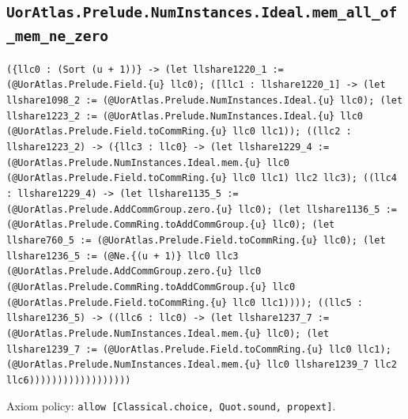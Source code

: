 \documentclass[11pt]{article}
\begin{document}
\subsection*{\texttt{UorAtlas.Prelude.NumInstances.Ideal.mem\_all\_of\_mem\_ne\_zero}}
\noindent\texttt{(\{llc0 : (Sort (u + 1))\} -> (let llshare1220\_1 := (@UorAtlas.Prelude.Field.\{u\} llc0); ([llc1 : llshare1220\_1] -> (let llshare1098\_2 := (@UorAtlas.Prelude.NumInstances.Ideal.\{u\} llc0); (let llshare1223\_2 := (@UorAtlas.Prelude.NumInstances.Ideal.\{u\} llc0 (@UorAtlas.Prelude.Field.toCommRing.\{u\} llc0 llc1)); ((llc2 : llshare1223\_2) -> (\{llc3 : llc0\} -> (let llshare1229\_4 := (@UorAtlas.Prelude.NumInstances.Ideal.mem.\{u\} llc0 (@UorAtlas.Prelude.Field.toCommRing.\{u\} llc0 llc1) llc2 llc3); ((llc4 : llshare1229\_4) -> (let llshare1135\_5 := (@UorAtlas.Prelude.AddCommGroup.zero.\{u\} llc0); (let llshare1136\_5 := (@UorAtlas.Prelude.CommRing.toAddCommGroup.\{u\} llc0); (let llshare760\_5 := (@UorAtlas.Prelude.Field.toCommRing.\{u\} llc0); (let llshare1236\_5 := (@Ne.\{(u + 1)\} llc0 llc3 (@UorAtlas.Prelude.AddCommGroup.zero.\{u\} llc0 (@UorAtlas.Prelude.CommRing.toAddCommGroup.\{u\} llc0 (@UorAtlas.Prelude.Field.toCommRing.\{u\} llc0 llc1)))); ((llc5 : llshare1236\_5) -> ((llc6 : llc0) -> (let llshare1237\_7 := (@UorAtlas.Prelude.NumInstances.Ideal.mem.\{u\} llc0); (let llshare1239\_7 := (@UorAtlas.Prelude.Field.toCommRing.\{u\} llc0 llc1); (@UorAtlas.Prelude.NumInstances.Ideal.mem.\{u\} llc0 llshare1239\_7 llc2 llc6))))))))))))))))))}\par
\noindent Axiom policy: \texttt{allow [Classical.choice, Quot.sound, propext]}.\par
\end{document}
